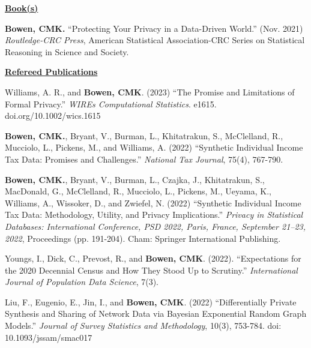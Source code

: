 
\noindent\underline{\textbf{Book(s)}}
\begin{etaremune}[topsep=0pt, itemsep=0pt, partopsep=0pt, parsep=0pt]
  \item \textbf{Bowen, CMK.} ``Protecting Your Privacy in a Data-Driven World.'' (Nov. 2021) \textit{Routledge-CRC Press}, American Statistical Association-CRC Series on Statistical Reasoning in Science and Society.
\end{etaremune}

\vspace{6pt}
\noindent\underline{\textbf{Refereed Publications}}
\vspace{4pt}
\begin{etaremune}[topsep=0pt, itemsep=5pt, partopsep=0pt, parsep=0pt]
    \item Williams, A. R., and \textbf{Bowen, CMK}. (2023) ``The Promise and Limitations of Formal Privacy.'' \textit{WIREs Computational Statistics}. e1615. doi.org/10.1002/wics.1615
    
    \item \textbf{Bowen, CMK.}, Bryant, V., Burman, L., Khitatrakun, S., McClelland, R., Mucciolo, L., Pickens, M., and Williams, A. (2022) ``Synthetic Individual Income Tax Data: Promises and Challenges.'' \textit{National Tax Journal}, 75(4), 767-790.
    
    \item \textbf{Bowen, CMK.}, Bryant, V., Burman, L., Czajka, J., Khitatrakun, S., MacDonald, G., McClelland, R., Mucciolo, L., Pickens, M., Ueyama, K., Williams, A., Wissoker, D., and Zwiefel, N. (2022) ``Synthetic Individual Income Tax Data: Methodology, Utility, and Privacy Implications.'' \textit{Privacy in Statistical Databases: International Conference, PSD 2022, Paris, France, September 21–23, 2022}, Proceedings (pp. 191-204). Cham: Springer International Publishing.
    
    \item Youngs, I., Dick, C., Prevost, R., and \textbf{Bowen, CMK}. (2022). ``Expectations for the 2020 Decennial Census and How They Stood Up to Scrutiny.'' \textit{International Journal of Population Data Science}, 7(3).
    
    \item Liu, F., Eugenio, E., Jin, I., and \textbf{Bowen, CMK}. (2022) ``Differentially Private Synthesis and Sharing of Network Data via Bayesian Exponential Random Graph Models.'' \textit{Journal of Survey Statistics and Methodology}, 10(3), 753-784. doi: 10.1093/jssam/smac017
    

\end{etaremune}
